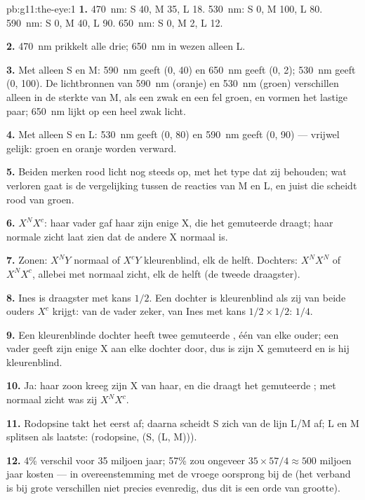 \begin{solution}{pb:g11:the-eye:1}
\textbf{1.} \qty{470}{nm}: S 40, M 35, L 18. \qty{530}{nm}: S 0, M 100,
L 80. \qty{590}{nm}: S 0, M 40, L 90. \qty{650}{nm}: S 0, M 2, L 12.

\textbf{2.} \qty{470}{nm} prikkelt alle drie; \qty{650}{nm} in wezen
alleen L.

\textbf{3.} Met alleen S en M: \qty{590}{nm} geeft (0, 40) en
\qty{650}{nm} geeft (0, 2); \qty{530}{nm} geeft (0, 100). De lichtbronnen
van \qty{590}{nm} (oranje) en \qty{530}{nm} (groen) verschillen alleen in
de sterkte van M, als een zwak en een fel groen, en vormen het lastige
paar; \qty{650}{nm} lijkt op een heel zwak licht.

\textbf{4.} Met alleen S en L: \qty{530}{nm} geeft (0, 80) en
\qty{590}{nm} geeft (0, 90) --- vrijwel gelijk: groen en oranje worden
verward.

\textbf{5.} Beiden merken rood licht nog steeds op, met het type 
dat zij behouden; wat verloren gaat is de vergelijking tussen de reacties
van M en L, en juist die scheidt rood van groen.

\textbf{6.} $X^NX^c$: haar vader gaf haar zijn enige X, die het gemuteerde
 draagt; haar normale zicht laat zien dat de andere X normaal is.

\textbf{7.} Zonen: $X^NY$ normaal of $X^cY$ kleurenblind, elk de helft.
Dochters: $X^NX^N$ of $X^NX^c$, allebei met normaal zicht, elk de helft
(de tweede draagster).

\textbf{8.} Ines is draagster met kans $1/2$. Een dochter is kleurenblind
als zij van beide ouders $X^c$ krijgt: van de vader zeker, van Ines met
kans $1/2 \times 1/2$: $1/4$.

\textbf{9.} Een kleurenblinde dochter heeft twee gemuteerde
, één van elke ouder; een vader geeft zijn enige X aan elke
dochter door, dus is zijn X gemuteerd en is hij kleurenblind.

\textbf{10.} Ja: haar zoon kreeg zijn X van haar, en die draagt het
gemuteerde ; met normaal zicht was zij $X^NX^c$.

\textbf{11.} Rodopsine takt het eerst af; daarna scheidt S zich van de
lijn L/M af; L en M splitsen als laatste: (rodopsine, (S, (L, M))).

\textbf{12.} 4\% verschil voor 35 miljoen jaar; 57\% zou ongeveer
$35 \times 57/4 \approx 500$ miljoen jaar kosten --- in overeenstemming
met de vroege oorsprong bij de  (het verband is bij grote
verschillen niet precies evenredig, dus dit is een orde van grootte).


\end{solution}
